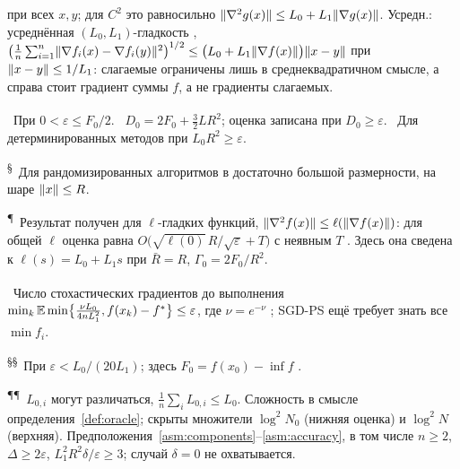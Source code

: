 \begin{center}
при всех $x,y$; для $C^2$ это равносильно $\lVert\nabla^2g(x)\rVert\le L_0+L_1\lVert\nabla g(x)\rVert$.
Усредн.: усреднённая $(L_0,L_1)$-гладкость \citep[предположение~1(ii)]{reisizadeh2023variance},
$\bigl(\frac1n\sum_{i=1}^n\lVert\nabla f_i(x)-\nabla f_i(y)\rVert^2\bigr)^{1/2}\le\bigl(L_0+L_1\lVert\nabla f(x)\rVert\bigr)\lVert x-y\rVert$
при $\lVert x-y\rVert\le1/L_1$: слагаемые ограничены лишь в среднеквадратичном смысле,
а справа стоит градиент суммы $f$, а не градиенты слагаемых.\par\smallskip
\textsuperscript{\dag}~При $0<\varepsilon\le F_0/2$.\quad
\textsuperscript{\ddag}~$D_0=2F_0+\frac32LR^2$; оценка записана при $D_0\ge\varepsilon$.\quad
\textsuperscript{\dag\dag}~Для детерминированных методов при $L_0R^2\ge\varepsilon$.\par
\textsuperscript{\S}~Для рандомизированных алгоритмов в достаточно большой размерности, на шаре $\lVert x\rVert\le R$.\par
\textsuperscript{\P}~Результат получен для $\ell$-гладких функций,
$\lVert\nabla^2f(x)\rVert\le\ell(\lVert\nabla f(x)\rVert)$: для общей $\ell$ оценка равна
$O\bigl(\sqrt{\ell(0)}\,R/\sqrt\varepsilon+T\bigr)$ с неявным $T$
\citep[следствие~5.3]{tyurin2026accelerated}. Здесь она сведена к $\ell(s)=L_0+L_1s$
\citep[теорема~4.3]{tyurin2026accelerated} при $\bar R=R$, $\Gamma_0=2F_0/R^2$.\par
\textsuperscript{\ddag\ddag}~Число стохастических градиентов до выполнения
$\min_k\mathbb E\min\bigl\{\frac{\nu L_0}{4nL_1^2},f(x_k)-f^\ast\bigr\}\le\varepsilon$, где
$\nu=e^{-\nu}$ \citep[теоремы~7.2, 7.3]{gorbunov2024methods}; SGD-PS ещё
требует знать все $\min f_i$.\par
\textsuperscript{\S\S}~При $\varepsilon<L_0/(20L_1)$; здесь $F_0=f(x_0)-\inf f$
\citep[теорема~4]{reisizadeh2023variance}.\par
\textsuperscript{\P\P}~$L_{0,i}$ могут различаться, $\frac1n\sum_iL_{0,i}\le L_0$.
Сложность в смысле определения~\ref{def:oracle}; скрыты множители $\log^2N_0$ (нижняя оценка)
и $\log^2N$ (верхняя). Предположения~\ref{asm:components}--\ref{asm:accuracy}, в том числе $n\ge2$,
$\Delta\ge2\varepsilon$, $L_1^2R^2\delta/\varepsilon\ge3$; случай $\delta=0$ не охватывается.\par
\end{center}
